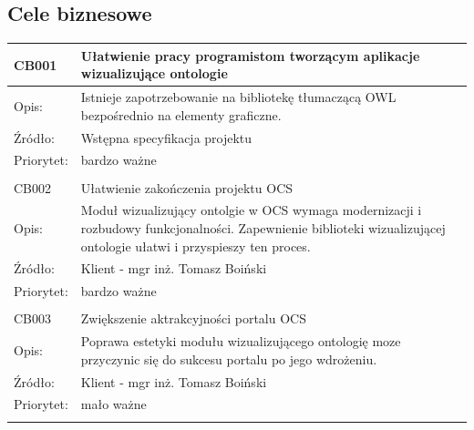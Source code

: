 \documentclass[a4paper,10pt]{article}
\begin{document}
\subsection{Cele biznesowe}




\begin{center}
\begin{tabular}{|m{3cm}|m{9cm}|} \hline

CB001 & Ułatwienie pracy programistom tworzącym aplikacje wizualizujące ontologie  \\ \hline
Opis: & Istnieje zapotrzebowanie na bibliotekę tłumaczącą OWL bezpośrednio na elementy graficzne.  \\ \hline
Źródło: & Wstępna specyfikacja projektu \\ \hline
Priorytet: & bardzo ważne \\ \hline
\multicolumn{2}{c}{} \\


 \hline
CB002 & Ułatwienie zakończenia projektu OCS   \\ \hline
Opis: & Moduł wizualizujący ontolgie w OCS wymaga modernizacji i rozbudowy funkcjonalności. Zapewnienie biblioteki wizualizującej ontologie ułatwi i przyspieszy ten proces.  \\ \hline
Źródło:& Klient - mgr inż. Tomasz Boiński   \\ \hline
Priorytet: & bardzo ważne \\ \hline
\multicolumn{2}{c}{} \\
 \hline
CB003 & Zwiększenie aktrakcyjności portalu OCS   \\ \hline
Opis: & Poprawa estetyki modułu wizualizującego ontologię moze przyczynic się do sukcesu portalu po jego wdrożeniu.  \\ \hline
Źródło: & Klient - mgr inż. Tomasz Boiński \\ \hline
Priorytet: & mało ważne \\ \hline
\multicolumn{2}{c}{} \\
\end{tabular}


\end{center}
\end{document}
